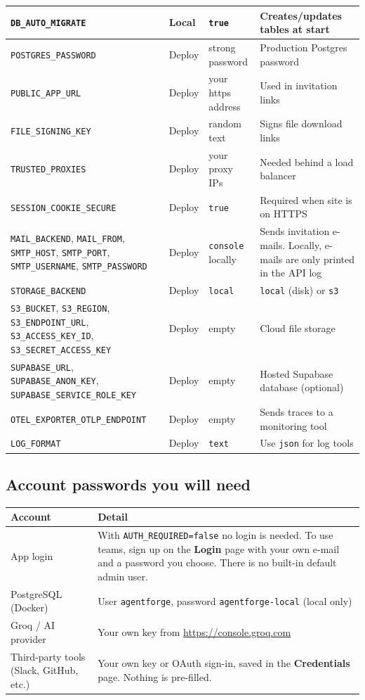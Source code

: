 \documentclass[11pt,a4paper]{article}
\newcommand{\env}[1]{\texttt{#1}}
\begin{document}
\begin{longtable}{@{}L{4.6cm}L{2.2cm}L{4.4cm}L{4.4cm}@{}}
\env{DB\_AUTO\_MIGRATE} & Local & \texttt{true} & Creates/updates tables at start \\
\midrule
\env{POSTGRES\_PASSWORD} & Deploy & strong password & Production Postgres password \\
\env{PUBLIC\_APP\_URL} & Deploy & your https address & Used in invitation links \\
\env{FILE\_SIGNING\_KEY} & Deploy & random text & Signs file download links \\
\env{TRUSTED\_PROXIES} & Deploy & your proxy IPs & Needed behind a load balancer \\
\env{SESSION\_COOKIE\_SECURE} & Deploy & \texttt{true} & Required when site is on HTTPS \\
\env{MAIL\_BACKEND}, \env{MAIL\_FROM}, \env{SMTP\_HOST}, \env{SMTP\_PORT}, \env{SMTP\_USERNAME}, \env{SMTP\_PASSWORD} & Deploy & \texttt{console} locally & Sends invitation e-mails. Locally, e-mails are only printed in the API log \\
\env{STORAGE\_BACKEND} & Deploy & \texttt{local} & \texttt{local} (disk) or \texttt{s3} \\
\env{S3\_BUCKET}, \env{S3\_REGION}, \env{S3\_ENDPOINT\_URL}, \env{S3\_ACCESS\_KEY\_ID}, \env{S3\_SECRET\_ACCESS\_KEY} & Deploy & empty & Cloud file storage \\
\env{SUPABASE\_URL}, \env{SUPABASE\_ANON\_KEY}, \env{SUPABASE\_SERVICE\_ROLE\_KEY} & Deploy & empty & Hosted Supabase database (optional) \\
\env{OTEL\_EXPORTER\_OTLP\_ENDPOINT} & Deploy & empty & Sends traces to a monitoring tool \\
\env{LOG\_FORMAT} & Deploy & \texttt{text} & Use \texttt{json} for log tools \\
\bottomrule
\end{longtable}

\subsection{Account passwords you will need}

\begin{longtable}{@{}L{4.4cm}L{11cm}@{}}
\toprule
\textbf{Account} & \textbf{Detail} \\
\midrule
\endhead
App login & With \env{AUTH\_REQUIRED=false} no login is needed. To use teams, sign up on the \textbf{Login} page with your own e-mail and a password you choose. There is no built-in default admin user. \\
PostgreSQL (Docker) & User \texttt{agentforge}, password \texttt{agentforge-local} (local only) \\
Groq / AI provider & Your own key from \url{https://console.groq.com} \\
Third-party tools (Slack, GitHub, etc.) & Your own key or OAuth sign-in, saved in the \textbf{Credentials} page. Nothing is pre-filled. \\
\bottomrule
\end{longtable}
\end{document}
